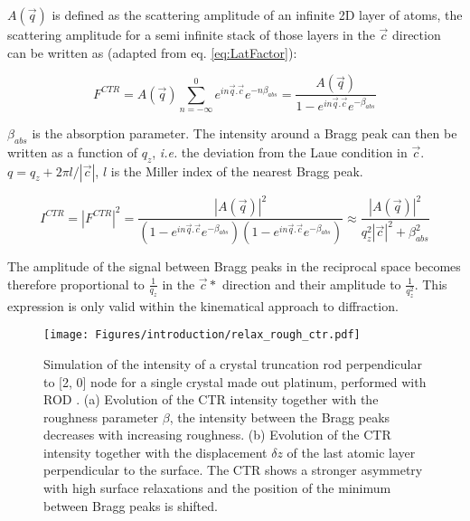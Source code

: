 $A(\vec{q})$ is defined as the scattering amplitude of an infinite 2D layer of atoms, the scattering amplitude for a semi infinite stack of those layers in the $\vec{c}$ direction can be written as (adapted from eq. \ref{eq:LatFactor}):

\begin{equation}
    \label{eq:CTR1}
    F^{CTR} = A(\vec{q})\sum_{n=-\infty}^0 e^{in\vec{q}.\vec{c}} e^{-n\beta_{abs}} = \frac{A(\vec{q})}{1 - e^{in\vec{q}.\vec{c}} e^{-\beta_{abs}}}
\end{equation}

$\beta_{abs}$ is the absorption parameter.
The intensity around a Bragg peak can then be written as a function of $q_z$, \textit{i.e.} the deviation from the Laue condition in $\vec{c}$.
$q = q_z + 2\pi l/|\vec{c}|$, $l$ is the Miller index of the nearest Bragg peak.

\begin{equation}
    \label{eq:CTR2}
    I^{CTR} = |F^{CTR}|^2 = \frac{|A(\vec{q})|^2}{(1 - e^{in\vec{q}.\vec{c}} e^{-\beta_{abs}})(1 - e^{in\vec{q}.\vec{c}} e^{-\beta_{abs}})} \approx \frac{|A(\vec{q})|^2}{q_z^2 |\vec{c}|^2 + \beta_{abs}^2 }
\end{equation}

The amplitude of the signal between Bragg peaks in the reciprocal space becomes therefore proportional to $\frac{1}{q_z}$ in the $\vec{c}*$ direction and their amplitude to $\frac{1}{q_z^2}$.
This expression is only valid within the kinematical approach to diffraction.

\begin{figure}[!htb]
    \centering
    \texttt{[image: Figures/introduction/relax\_rough\_ctr.pdf]}
    \caption{
    Simulation of the intensity of a crystal truncation rod perpendicular to [2, 0] node for a single crystal made out platinum, performed with ROD \parencite{Vlieg2000}.
    (a) Evolution of the CTR intensity together with the roughness parameter $\beta$, the intensity between the Bragg peaks decreases with increasing roughness.
    (b) Evolution of the CTR intensity together with the displacement $\delta z$ of the last atomic layer perpendicular to the surface.
    The CTR shows a stronger asymmetry with high surface relaxations and the position of the minimum between Bragg peaks is shifted.
    }
    \label{fig:CTRSimulation}
\end{figure}

